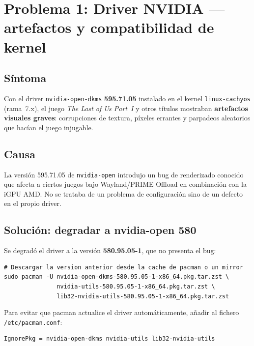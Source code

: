 \documentclass[12pt,a4paper]{article}
\begin{document}
\section{Problema 1: Driver NVIDIA --- artefactos y compatibilidad de kernel}

\subsection{Síntoma}

Con el driver \texttt{nvidia-open-dkms} \textbf{595.71.05} instalado en el
kernel \texttt{linux-cachyos} (rama~7.x), el juego
\emph{The Last of Us Part~I} y otros títulos mostraban \textbf{artefactos
visuales graves}: corrupciones de textura, píxeles errantes y parpadeos
aleatorios que hacían el juego injugable.

\subsection{Causa}

La versión 595.71.05 de \texttt{nvidia-open} introdujo un bug de renderizado
conocido que afecta a ciertos juegos bajo Wayland/PRIME Offload en
combinación con la iGPU AMD. No se trataba de un problema de configuración
sino de un defecto en el propio driver.

\subsection{Solución: degradar a nvidia-open 580}

Se degradó el driver a la versión \textbf{580.95.05-1}, que no presenta el
bug:

\begin{lstlisting}[style=bash]
# Descargar la version anterior desde la cache de pacman o un mirror
sudo pacman -U nvidia-open-dkms-580.95.05-1-x86_64.pkg.tar.zst \
               nvidia-utils-580.95.05-1-x86_64.pkg.tar.zst \
               lib32-nvidia-utils-580.95.05-1-x86_64.pkg.tar.zst
\end{lstlisting}

Para evitar que pacman actualice el driver automáticamente, añadir al fichero
\texttt{/etc/pacman.conf}:

\begin{lstlisting}[style=bash]
IgnorePkg = nvidia-open-dkms nvidia-utils lib32-nvidia-utils
\end{lstlisting}
\end{document}

